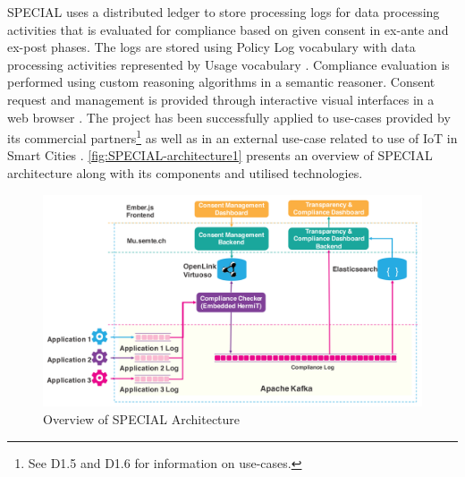SPECIAL uses a distributed ledger to store processing logs for data processing activities that is evaluated for compliance based on given consent in ex-ante and ex-post phases. The logs are stored using Policy Log vocabulary \cite{bonatti_special_2018-1} with data processing activities represented by Usage vocabulary \cite{bonatti_special_2018-2}. Compliance evaluation is performed using custom reasoning algorithms \cite{bonatti_fast_2018,bonatti_richer_2019} in a semantic reasoner. Consent request and management is provided through interactive visual interfaces in a web browser \cite{drozd_consent_2019,gritzalis_i_2019}. The project has been successfully applied to use-cases provided by its commercial partners\footnote{See D1.5 \cite{bonatti_d1.5_2018} and D1.6 \cite{schlehahn_d1.6_2018} for information on use-cases.} as well as in an external use-case related to use of IoT in Smart Cities \cite{fernandez_user_2019}. \autoref{fig:SPECIAL-architecture1} presents an overview of SPECIAL architecture along with its components and utilised technologies.
\begin{figure}[htbp]
    \centering
    \includegraphics[width=\linewidth]{img/SPECIAL_architecture1.png}
    \caption{Overview of SPECIAL Architecture \cite{kirrane_scalable_2018}}
    \label{fig:SPECIAL-architecture1}
\end{figure}

